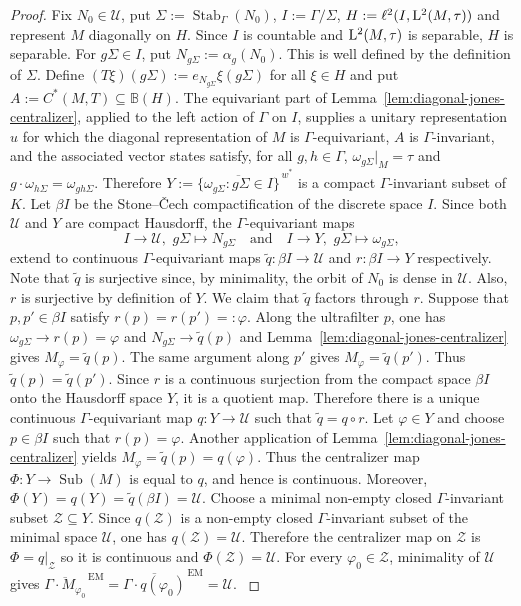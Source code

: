\documentclass[12pt]{amsart} %
\theoremstyle{plain}
\theoremstyle{definition}
\newcommand{\B}{\mathbb{B}}
\newcommand{\LL}{{\rm L}}
\DeclareMathOperator{\Sub}{Sub}
\begin{document}
\begin{proof}
{
Fix $N_0\in\mathcal U$, put $\Sigma:=\operatorname{Stab}_\Gamma(N_0)$, $I:=\Gamma/\Sigma$, $H:=\ell^2(I,\LL^2(M,\tau))$ and represent $M$ diagonally on $H$. Since $I$ is countable and $\LL^2(M,\tau)$ is
separable, $H$ is separable. For $g\Sigma\in I$, put $N_{g\Sigma}:=\alpha_g(N_0)$. This is well defined by the definition of $\Sigma$. Define $(T\xi)(g\Sigma):=e_{N_{g\Sigma}}\xi(g\Sigma)$ for all $\xi\in H$ and put $A:=C^*(M,T)\subseteq\B(H)$. The equivariant part of
Lemma~\ref{lem:diagonal-jones-centralizer}, applied to the left action of
$\Gamma$ on $I$, supplies a unitary representation $u$ for which the
diagonal representation of $M$ is $\Gamma$-equivariant, $A$ is
$\Gamma$-invariant, and the associated vector states satisfy, for all $g,h\in\Gamma$,
$\omega_{g\Sigma}|_M=\tau$ and $g\cdot\omega_{h\Sigma}=\omega_{gh\Sigma}$.
Therefore $Y:=\overline{\{\omega_{g\Sigma}:g\Sigma\in I\}}^{\,w^*}$ is a compact $\Gamma$-invariant subset of $K$.
\medskip
\noindent Let $\beta I$ be the Stone--\v{C}ech compactification of the discrete
space $I$. Since both $\mathcal{U}$ and $Y$ are compact Hausdorff, the $\Gamma$-equivariant maps
$$
I\to\mathcal U,
\,\,
g\Sigma\mapsto N_{g\Sigma}\quad\text{and}\quad
I\to Y,
\,\,
g\Sigma\mapsto\omega_{g\Sigma},
$$
extend to continuous $\Gamma$-equivariant maps $\widetilde q:\beta I\to\mathcal U$ and $r:\beta I\to Y$ respectively. Note that $\widetilde{q}$ is surjective since, by minimality, the orbit of $N_0$ is dense in $\mathcal{U}$. Also, $r$ is surjective by definition of $Y$. We claim that $\widetilde q$ factors through $r$. Suppose that
$p,p'\in\beta I$ satisfy $r(p)=r(p')=:\varphi$. Along the ultrafilter $p$,
one has $\omega_{g\Sigma}\to r(p)=\varphi$ and $N_{g\Sigma}\to\widetilde q(p)$ and Lemma~\ref{lem:diagonal-jones-centralizer} gives $M_\varphi=\widetilde q(p)$. The same argument along $p'$ gives $M_\varphi=\widetilde q(p')$. Thus $\widetilde q(p)=\widetilde q(p')$. {Since $r$ is a continuous surjection from the compact space $\beta I$ onto the Hausdorff space $Y$, it is a quotient map. Therefore}
there is a unique continuous $\Gamma$-equivariant map $q:Y\to\mathcal U$ such that $\widetilde q=q\circ r$.
\medskip
\noindent Let $\varphi\in Y$ and choose $p\in\beta I$ such that $r(p)=\varphi$.
Another application of Lemma~\ref{lem:diagonal-jones-centralizer} yields $M_\varphi=\widetilde q(p)=q(\varphi)$. Thus the centralizer map $\Phi:Y\to\Sub(M)$ is equal to $q$, and hence is
continuous. Moreover, $\Phi(Y)=q(Y)=\widetilde q(\beta I)=\mathcal U$. Choose a minimal non-empty closed $\Gamma$-invariant subset
$\mathcal Z\subseteq Y$. Since $q(\mathcal Z)$ is a non-empty closed
$\Gamma$-invariant subset of the minimal space $\mathcal U$, one has $q(\mathcal Z)=\mathcal U$. Therefore the centralizer map on $\mathcal Z$ is $\Phi=q|_{\mathcal Z}$ so it is continuous and $\Phi(\mathcal Z)=\mathcal U$. For every
$\varphi_0\in\mathcal Z$, minimality of $\mathcal U$ gives
$\overline{\Gamma\cdot M_{\varphi_0}}^{\,\mathrm{EM}}
=
\overline{\Gamma\cdot q(\varphi_0)}^{\,\mathrm{EM}}
=
\mathcal U$.
}
\end{proof}
\end{document}

